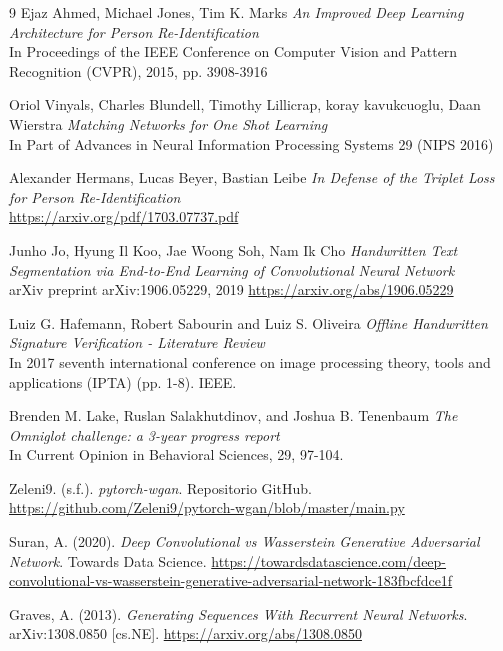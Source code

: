 \begin{thebibliography}{9}
Ejaz Ahmed, Michael Jones, Tim K. Marks
\textit{ An Improved Deep Learning Architecture for Person Re-Identification } \\
In Proceedings of the IEEE Conference on Computer Vision and Pattern Recognition (CVPR), 2015, pp. 3908-3916

Oriol Vinyals, Charles Blundell, Timothy Lillicrap, koray kavukcuoglu, Daan Wierstra
\textit{ Matching Networks for One Shot Learning } \\
In Part of Advances in Neural Information Processing Systems 29 (NIPS 2016)

Alexander Hermans, Lucas Beyer, Bastian Leibe
\textit{ In Defense of the Triplet Loss for Person Re-Identification } \\
\url{https://arxiv.org/pdf/1703.07737.pdf }

Junho Jo, Hyung Il Koo, Jae Woong Soh, Nam Ik Cho
\textit{ Handwritten Text Segmentation via End-to-End Learning of Convolutional Neural Network } \\
arXiv preprint arXiv:1906.05229, 2019
\url{https://arxiv.org/abs/1906.05229}

Luiz G. Hafemann, Robert Sabourin and Luiz S. Oliveira
\textit{ Offline Handwritten Signature Verification - Literature Review } \\
In 2017 seventh international conference on image processing theory, tools and applications (IPTA) (pp. 1-8). IEEE.

Brenden M. Lake, Ruslan Salakhutdinov, and Joshua B. Tenenbaum
\textit{ The Omniglot challenge: a 3-year progress report } \\
In Current Opinion in Behavioral Sciences, 29, 97-104.

Zeleni9. (s.f.).
\textit{pytorch-wgan}.
Repositorio GitHub.
\url{https://github.com/Zeleni9/pytorch-wgan/blob/master/main.py}

Suran, A. (2020).
\textit{Deep Convolutional vs Wasserstein Generative Adversarial Network}.
Towards Data Science.
\url{https://towardsdatascience.com/deep-convolutional-vs-wasserstein-generative-adversarial-network-183fbcfdce1f}

Graves, A. (2013).
\textit{Generating Sequences With Recurrent Neural Networks}.
arXiv:1308.0850 [cs.NE].
\url{https://arxiv.org/abs/1308.0850}

\end{thebibliography}